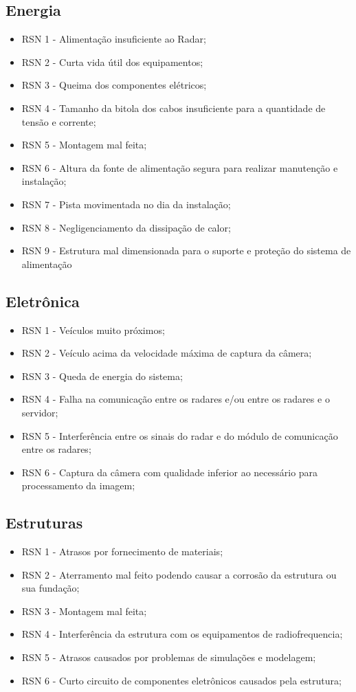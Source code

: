 \subsection{Energia}
\begin{itemize}
   \item RSN 1 - Alimentação insuficiente ao Radar;
   \item RSN 2 - Curta vida útil dos equipamentos; 
   \item RSN 3 - Queima dos componentes elétricos;
   \item RSN 4 - Tamanho da bitola dos cabos insuficiente para a quantidade de tensão e corrente;
   \item RSN 5 - Montagem mal feita;
   \item RSN 6 - Altura da fonte de alimentação segura para realizar manutenção e instalação;
   \item RSN 7 - Pista movimentada no dia da instalação;
   \item RSN 8 - Negligenciamento da dissipação de calor;
   \item RSN 9 - Estrutura mal dimensionada para o suporte e proteção do sistema de alimentação
\end{itemize}

\subsection{Eletrônica}

\begin{itemize}

	\item RSN 1 - Veículos muito próximos;
	\item RSN 2 - Veículo acima da velocidade máxima de captura da câmera;
	\item RSN 3 - Queda de energia do sistema;
	\item RSN 4 - Falha na comunicação entre os radares e/ou entre os radares e o servidor;
	\item RSN 5 - Interferência entre os sinais do radar e do módulo de comunicação entre os radares;
	\item RSN 6 - Captura da câmera com qualidade inferior ao necessário para processamento da imagem;
	
\end{itemize} 	

\subsection{Estruturas}
\begin{itemize}
	\item RSN 1 - Atrasos por fornecimento de materiais;
	\item RSN 2 - Aterramento mal feito podendo causar a corrosão da estrutura ou sua fundação;
	\item RSN 3 - Montagem mal feita;
	\item RSN 4 - Interferência da estrutura com os equipamentos de radiofrequencia;
	\item RSN 5 - Atrasos causados por problemas de simulações e modelagem;
	\item RSN 6 - Curto circuito de componentes eletrônicos causados pela estrutura;
\end{itemize}
